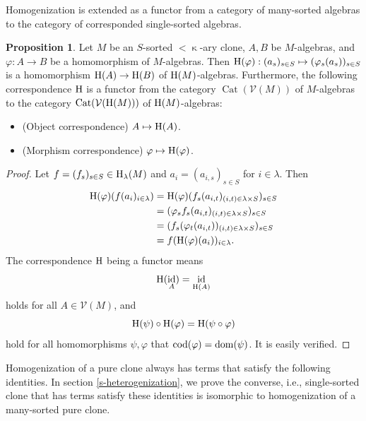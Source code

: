 \documentclass[a4paper,10pt]{article}
\theoremstyle{definition}
\newtheorem{prop}[df]{Proposition}
\newcommand\ph{\varphi}
\newcommand\ra{\rightarrow}
\DeclareMathOperator{\id}{id}
\newcommand\mc{\mathclose}
\newcommand\V{\mathcal{V}}
\DeclareMathOperator{\Cat}{Cat}
\newcommand\dom{{\rm dom}}
\newcommand\cod{{\rm cod}}
\begin{document}
Homogenization is extended as a functor from a category of 
many-sorted algebras to the category of corresponded single-sorted
algebras.
\begin{prop}\label{many-single}
Let $M$ be an $S$-sorted $<\mc\kappa$-ary clone, $A,B$ be $M$-algebras,
and $\ph:A\ra B$ be a homomorphism of $M$-algebras.
Then ${\rm H}(\ph):(a_s)_{s\in S}\mapsto (\ph_s(a_s))_{s\in S}$ is a
homomorphism ${\rm H}(A)\ra {\rm H}(B)$ of ${\rm H}(M)$-algebras.
Furthermore, the following correspondence ${\rm H}$ is a functor from the
category $\Cat(\V(M))$ of $M$-algebras to the category $\Cat(\V({\rm H}(M)))$
of ${\rm H}(M)$-algebras:
\begin{itemize}
\item
(Object correspondence) $A\mapsto {\rm H}(A)$.
\item
(Morphism correspondence) $\ph\mapsto {\rm H}(\ph)$.
\end{itemize}
\end{prop}
\begin{proof}
Let $f=(f_s)_{s\in S}\in {\rm H}_\lambda(M)$ and $a_i=(a_{i,s})_{s\in S}$ for $i\in\lambda$. Then
\begin{align*}
{\rm H}(\ph)(f(a_i)_{i\in\lambda})
&={\rm H}(\ph)(f_s(a_{i,t})_{(i,t)\in\lambda\times S})_{s\in S}\\
&=(\ph_s f_s(a_{i,t})_{(i,t)\in\lambda\times S})_{s\in S}\\
&=(f_s(\ph_t(a_{i,t}))_{(i,t)\in\lambda\times S})_{s\in S}\\
&=f({\rm H}(\ph)(a_i))_{i\in\lambda}.
\end{align*}
The correspondence ${\rm H}$ being a functor means
\[
{\rm H}(\id_A)=\id_{{\rm H}(A)}
\]
holds for all $A\in\V(M)$, and
\[
{\rm H}(\psi)\circ{\rm H}(\ph)={\rm H}(\psi\circ\ph)
\]
hold for all homomorphisms $\psi,\ph$ that $\cod(\ph)=\dom(\psi)$.
It is easily verified.
\end{proof}

Homogenization of a pure clone always has terms that satisfy the following identities.
In section \ref{s-heterogenization}, we prove the converse, i.e.,
single-sorted clone that has terms satisfy these identities
is isomorphic to homogenization of a many-sorted pure clone.
\end{document}
